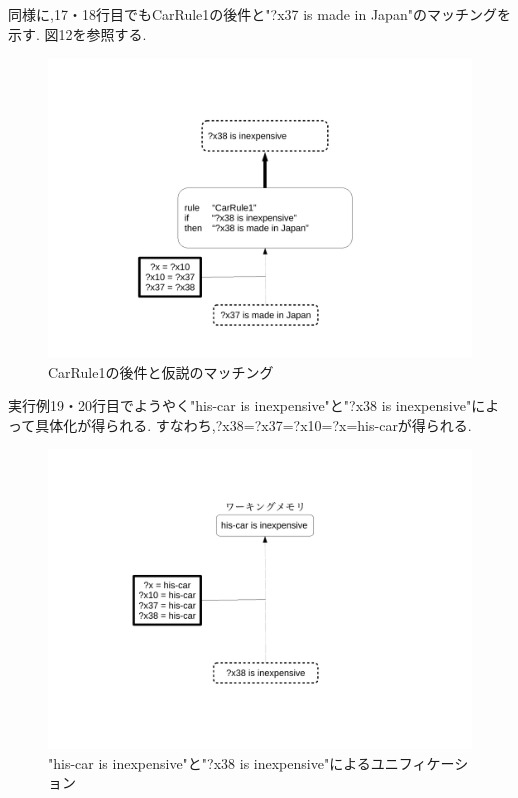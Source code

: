 \documentclass[uplatex,12pt]{jsarticle}
\begin{document}
同様に,17・18行目でもCarRule1の後件と"?x37 is made in Japan"のマッチングを示す.
図12を参照する.
\begin{figure}[!hbt]
    \centering
    \includegraphics[scale=0.30]{images/backward_chaining_8.pdf}
    \caption{CarRule1の後件と仮説のマッチング}
\end{figure}

\newpage

実行例19・20行目でようやく"his-car is inexpensive"と"?x38 is inexpensive"によって具体化が得られる.
すなわち,?x38=?x37=?x10=?x=his-carが得られる.
\begin{figure}[!hbt]
    \centering
    \includegraphics[scale=0.30]{images/backward_chaining_9.pdf}
    \caption{"his-car is inexpensive"と"?x38 is inexpensive"によるユニフィケーション}
\end{figure}
\end{document}

